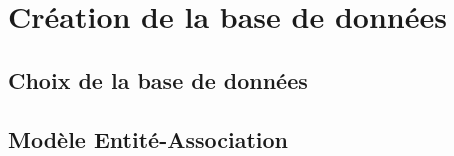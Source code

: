 \chapter{Création de la base de données}

    \section{Choix de la base de données}

        
    \section{Modèle Entité-Association}



